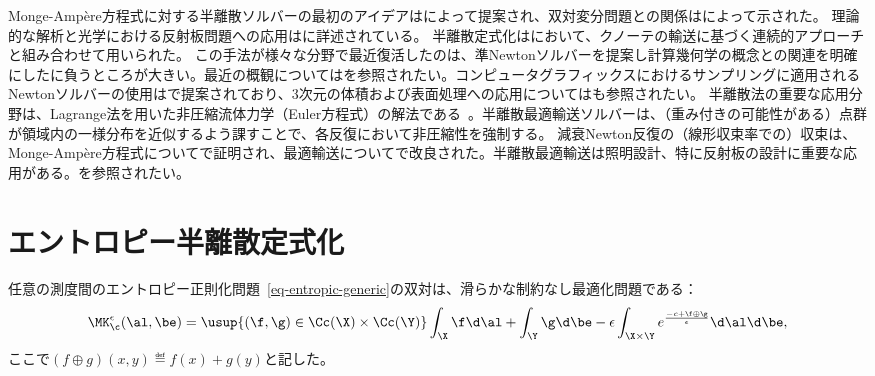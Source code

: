 Monge-Ampère方程式に対する半離散ソルバーの最初のアイデアは\citet{oliker1989numerical}によって提案され、双対変分問題との関係は\citet{AurenhammerHA98}によって示された。
%
理論的な解析と光学における反射板問題への応用は\citep{caffarelli1999problem}に詳述されている。
%
半離散定式化は\citep{carlier2010knothe}において、クノーテの輸送に基づく連続的アプローチと組み合わせて用いられた。
%
この手法が様々な分野で最近復活したのは、準Newtonソルバーを提案し計算幾何学の概念との関連を明確にした\citet{Merigot11}に負うところが大きい。最近の概観については\citep{Levy2017review}を参照されたい。コンピュータグラフィックスにおけるサンプリングに適用されるNewtonソルバーの使用は\citep{de2012blue}で提案されており、3次元の体積および表面処理への応用については\citep{levy2015numerical}も参照されたい。
%
半離散法の重要な応用分野は、Lagrange法を用いた非圧縮流体力学（Euler方程式）の解法である~\citep{deGoes2015,gallouet2017lagrangian}。半離散最適輸送ソルバーは、（重み付きの可能性がある）点群が領域内の一様分布を近似するよう課すことで、各反復において非圧縮性を強制する。
%
減衰Newton反復の（線形収束率での）収束は、Monge-Ampère方程式について\citep{mirebeau2015discretization}で証明され、最適輸送について\citep{kitagawa2016newton}で改良された。半離散最適輸送は照明設計、特に反射板の設計に重要な応用がある。\citep{merigot2017light}を参照されたい。

\section{エントロピー半離散定式化}
\label{sec-semi-discr-entropy}

任意の測度間のエントロピー正則化問題~\eqref{eq-entropic-generic}の双対は、滑らかな制約なし最適化問題である：
\begin{equation}\label{eq-dual-entropic-generic}
	\MK_\c^\epsilon(\al,\be) =
	\usup{(\f,\g) \in \Cc(\X) \times \Cc(\Y)}
		 \int_\X \f\d\al + \int_\Y \g\d\be
		- \epsilon \int_{\X \times \Y}  e^{ \frac{-c + \f \oplus \g }{\epsilon} } \d\al\d\be,
\end{equation}
ここで$(f\oplus g)(x,y) \eqdef f(x)+g(y)$と記した。

